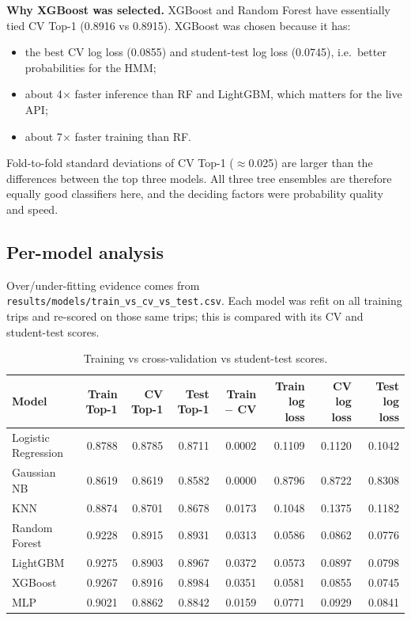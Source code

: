 \documentclass[10pt,a4paper]{article}
\newcommand{\code}[1]{\texttt{\small #1}}
\newcommand{\note}[1]{{\noindent\small\color{black!65}#1\par}}
\begin{document}
\medskip
\textbf{Why XGBoost was selected.} XGBoost and Random Forest have essentially tied CV Top-1 (0.8916 vs 0.8915). XGBoost was chosen because it has:
\begin{itemize}
  \item the best CV log loss (0.0855) and student-test log loss (0.0745), i.e.\ better probabilities for the HMM;
  \item about 4$\times$ faster inference than RF and LightGBM, which matters for the live API;
  \item about 7$\times$ faster training than RF.
\end{itemize}
Fold-to-fold standard deviations of CV Top-1 ($\approx$0.025) are larger than the differences between the top three models. All three tree ensembles are therefore equally good classifiers here, and the deciding factors were probability quality and speed.

\subsection{Per-model analysis}
\note{Over/under-fitting evidence comes from \code{results/models/train\_vs\_cv\_vs\_test.csv}. Each model was refit on all training trips and re-scored on those same trips; this is compared with its CV and student-test scores.}
\begin{table}[H]\centering\small
\caption{Training vs cross-validation vs student-test scores.}
\begin{tabular}{lrrrrrrr}
\toprule
Model & Train Top-1 & CV Top-1 & Test Top-1 & Train $-$ CV & Train log loss & CV log loss & Test log loss\\
\midrule
Logistic Regression & 0.8788 & 0.8785 & 0.8711 & 0.0002 & 0.1109 & 0.1120 & 0.1042\\
Gaussian NB & 0.8619 & 0.8619 & 0.8582 & 0.0000 & 0.8796 & 0.8722 & 0.8308\\
KNN & 0.8874 & 0.8701 & 0.8678 & 0.0173 & 0.1048 & 0.1375 & 0.1182\\
Random Forest & 0.9228 & 0.8915 & 0.8931 & 0.0313 & 0.0586 & 0.0862 & 0.0776\\
LightGBM & 0.9275 & 0.8903 & 0.8967 & 0.0372 & 0.0573 & 0.0897 & 0.0798\\
XGBoost & 0.9267 & 0.8916 & 0.8984 & 0.0351 & 0.0581 & 0.0855 & 0.0745\\
MLP & 0.9021 & 0.8862 & 0.8842 & 0.0159 & 0.0771 & 0.0929 & 0.0841\\
\bottomrule
\end{tabular}
\end{table}
\end{document}
